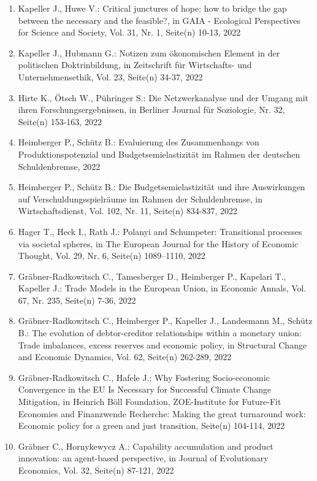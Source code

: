 \begin{enumerate}
	 \item Kapeller J., Huwe V.: Critical junctures of hope: how to bridge the gap between the necessary and the feasible?, in GAIA - Ecological Perspectives for Science and Society, Vol. 31, Nr. 1, Seite(n) 10-13, 2022
	 \item Kapeller J., Hubmann G.: Notizen zum ökonomischen Element in der politischen Doktrinbildung, in Zeitschrift für Wirtschafts- und Unternehmensethik, Vol. 23, Seite(n) 34-37, 2022
	 \item Hirte K., Ötsch W., Pühringer S.: Die Netzwerkanalyse und der Umgang mit ihren Forschungsergebnissen, in Berliner Journal für Soziologie, Nr. 32, Seite(n) 153-163, 2022
	 \item Heimberger P., Schütz B.: Evaluierung des Zusammenhangs von Produktionspotenzial und Budgetsemielastizität im Rahmen der deutschen Schuldenbremse, 2022
	 \item Heimberger P., Schütz B.: Die Budgetsemielastizität und ihre Auswirkungen auf Verschuldungsspielräume im Rahmen der Schuldenbremse, in Wirtschaftsdienst, Vol. 102, Nr. 11, Seite(n) 834-837, 2022
	 \item Hager T., Heck I., Rath J.: Polanyi and Schumpeter: Transitional processes via societal spheres, in The European Journal for the History of Economic Thought, Vol. 29, Nr. 6, Seite(n) 1089–1110, 2022
	 \item Gräbner-Radkowitsch C., Tamesberger D., Heimberger P., Kapelari T., Kapeller J.: Trade Models in the European Union, in Economic Annals, Vol. 67, Nr. 235, Seite(n) 7-36, 2022
	 \item Gräbner-Radkowitsch C., Heimberger P., Kapeller J., Landesmann M., Schütz B.: The evolution of debtor-creditor relationships within a monetary union: Trade imbalances, excess reserves and economic policy, in Structural Change and Economic Dynamics, Vol. 62, Seite(n) 262-289, 2022
	 \item Gräbner-Radkowitsch C., Hafele J.: Why Fostering Socio-economic Convergence in the EU Is Necessary for Successful Climate Change Mitigation, in Heinrich Böll Foundation, ZOE-Institute for Future-Fit Economies and Finanzwende Recherche: Making the great turnaround work: Economic policy for a green and just transition, Seite(n) 104-114, 2022
	 \item Gräbner C., Hornykewycz A.: Capability accumulation and product innovation: an agent-based perspective, in Journal of Evolutionary Economics, Vol. 32, Seite(n) 87-121, 2022
\end{enumerate}
